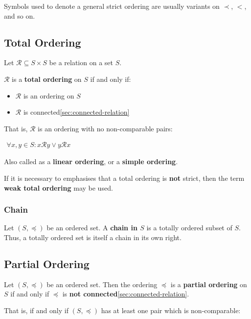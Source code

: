 Symbols used to denote a general strict ordering are usually variants
on $\prec$, $<$, and so on.


\subsection{Total Ordering}
\label{sec:total-ordering}

Let $\mathcal{R} \subseteq S \times S$ be a relation on a set $S$.

$\mathcal{R}$ is a \textbf{total ordering} on $S$ if and only if:

\begin{itemize}
\item $\mathcal{R}$ is an ordering on $S$
\item $\mathcal{R}$ is connected\ref{sec:connected-relation}
\end{itemize}

That is, $\mathcal{R}$ is an ordering with no non-comparable pairs:


\begin{math}
  \begin{array}{c}
    \forall x, y \in S: x \mathcal{R} y \lor y \mathcal{R} x
  \end{array}
\end{math}

Also called as a \textbf{linear ordering}, or a \textbf{simple
  ordering}.

If it is necessary to emphasises that a total ordering is \textbf{not}
strict, then the term \textbf{weak total ordering} may be used.

\subsubsection{Chain}
\label{sec:chain}

Let $(S, \preceq)$ be an ordered set. A \textbf{chain in $S$} is a
totally ordered subset of $S$. Thus, a totally ordered set is itself a
chain in its own right.


\subsection{Partial Ordering}
\label{sec:partial-ordering}

Let $(S, \preceq)$ be an ordered set. Then the ordering $\preceq$ is a
\textbf{partial ordering} on $S$ if and only if $\preceq$ is
\textbf{not connected}\ref{sec:connected-relation}.

That is, if and only if $(S, \preceq)$ has at least one pair which is
non-comparable:

